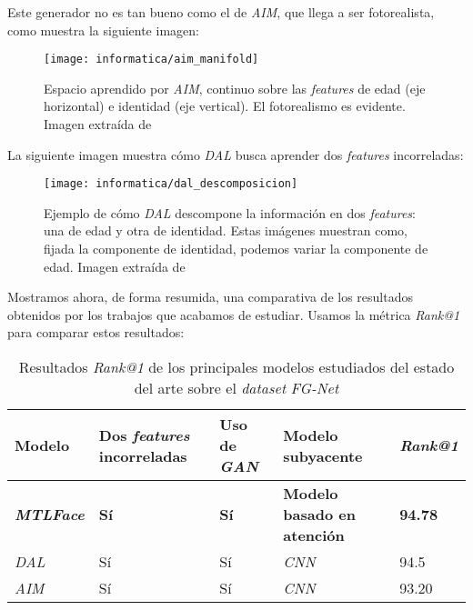 Este generador no es tan bueno como el de \textit{AIM}, que llega a ser fotorealista, como muestra la siguiente imagen:

\begin{figure}[H]
	\centering
	\texttt{[image: informatica/aim\_manifold]}
	\caption{Espacio aprendido por \textit{AIM}, continuo sobre las \textit{features} de edad (eje horizontal) e identidad (eje vertical). El fotorealismo es evidente. Imagen extraída de \cite{informatica:aim}}
\end{figure}

La siguiente imagen muestra cómo \textit{DAL} busca aprender dos \textit{features} incorreladas:

\begin{figure}[H]
	\centering
	\texttt{[image: informatica/dal\_descomposicion]}
	\caption{Ejemplo de cómo \textit{DAL} descompone la información en dos \textit{features}: una de edad y otra de identidad. Estas imágenes muestran como, fijada la componente de identidad, podemos variar la componente de edad. Imagen extraída de \cite{informatica:dal}}
\end{figure}

Mostramos ahora, de forma resumida, una comparativa de los resultados obtenidos por los trabajos que acabamos de estudiar. Usamos la métrica \textit{Rank@1} \footnotemark para comparar estos resultados:

\begin{table}[H]
	\centering
	\begin{tabular}{|l|l|l|l|l|}
		\hline
		Modelo                    & Dos \textit{features} incorreladas & Uso de \textit{GAN} & Modelo subyacente                  & \textit{Rank@1} \\
		\hline

		\textbf{\textit{MTLFace}} & \textbf{Sí}                        & \textbf{Sí}         & \textbf{Modelo basado en atención} & \textbf{94.78}  \\
		\textit{DAL}              & Sí                                 & Sí                  & \textit{CNN}                       & 94.5            \\
		\textit{AIM}              & Sí                                 & Sí                  & \textit{CNN}                       & 93.20           \\
		\hline
	\end{tabular}
	\caption{Resultados \textit{Rank@1} de los principales modelos estudiados del estado del arte sobre el \textit{dataset} \textit{FG-Net}}
\end{table}

